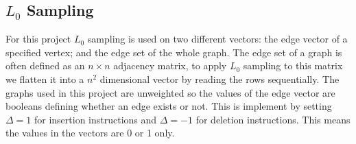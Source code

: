\documentclass[11pt,twoside,a4paper]{report}
\begin{document}
\subsection{$L_0$ Sampling}

For this project $L_0$ sampling is used on two different vectors: the edge vector of a specified vertex; and the edge set of the whole graph. The edge set of a graph is often defined as an $n\times n$ adjacency matrix, to apply $L_0$ sampling to this matrix we flatten it into a $n^2$ dimensional vector by reading the rows sequentially. The graphs used in this project are unweighted so the values of the edge vector are booleans defining whether an edge exists or not. This is implement by setting $\Delta=1$ for insertion instructions and $\Delta=-1$ for deletion instructions. This means the values in the vectors are 0 or 1 only.
\end{document}
